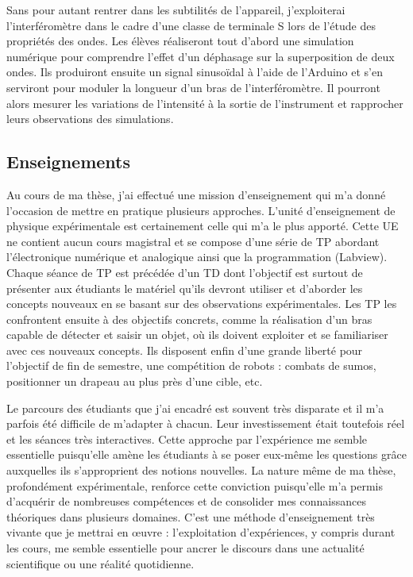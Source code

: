 \documentclass[12pt,a4paper]{article}
\begin{document}
Sans pour autant rentrer dans les subtilités de l'appareil, j'exploiterai l'interféromètre dans le cadre d'une classe de terminale S lors de l'étude des propriétés des ondes.
Les élèves réaliseront tout d'abord une simulation numérique pour comprendre l'effet d'un déphasage sur la superposition de deux ondes.
Ils produiront ensuite un signal sinusoïdal à l'aide de l'Arduino et s'en serviront pour moduler la longueur d'un bras de l'interféromètre.
Il pourront alors mesurer les variations de l'intensité à la sortie de l'instrument et rapprocher leurs observations des simulations. 

\subsection{Enseignements}

Au cours de ma thèse, j'ai effectué une mission d'enseignement qui m'a donné l'occasion de mettre en pratique plusieurs approches.
L'unité d'enseignement de physique expérimentale est certainement celle qui m'a le plus apporté.
Cette UE ne contient aucun cours magistral et se compose d'une série de TP abordant l'électronique numérique et analogique ainsi que la programmation (Labview).
Chaque séance de TP est précédée d'un TD dont l'objectif est surtout de présenter aux étudiants le matériel qu'ils devront utiliser et d'aborder les concepts nouveaux en se basant sur des observations expérimentales.
Les TP les confrontent ensuite à des objectifs concrets, comme la réalisation d'un bras capable de détecter et saisir un objet, où ils doivent exploiter et se familiariser avec ces nouveaux concepts.
Ils disposent enfin d'une grande liberté pour l'objectif de fin de semestre, une compétition de robots : combats de \og sumos\fg{}, positionner un drapeau au plus près d'une cible, etc.

Le parcours des étudiants que j'ai encadré est souvent très disparate et il m'a parfois été difficile de m'adapter à chacun.
Leur investissement était toutefois réel et les séances très interactives.
Cette approche par l'expérience me semble essentielle puisqu'elle amène les étudiants à se poser eux-même les questions grâce auxquelles ils s'approprient des notions nouvelles.
La nature même de ma thèse, profondément expérimentale, renforce cette conviction puisqu'elle m'a permis d'acquérir de nombreuses compétences et de consolider mes connaissances théoriques dans plusieurs domaines.
C'est une méthode d'enseignement très vivante que je mettrai en œuvre : l'exploitation d'expériences, y compris durant les cours, me semble essentielle pour ancrer le discours dans une actualité scientifique ou une réalité quotidienne.
\end{document}
